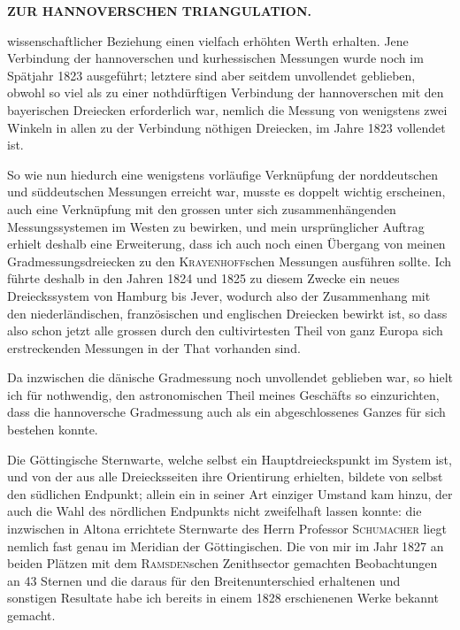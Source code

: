 \noindent\null\hfill{\small\textbf{ZUR HANNOVERSCHEN TRIANGULATION.}}\hfill{}\par\medskip
\noindent wissenschaftlicher Beziehung einen vielfach erhöhten Werth erhalten. Jene
Verbindung der hannoverschen und kurhessischen Messungen wurde noch
im Spätjahr 1823 ausgeführt; letztere sind aber seitdem unvollendet geblieben,
obwohl so viel als zu einer nothdürftigen Verbindung der hannoverschen mit
den bayerischen Dreiecken erforderlich war, nemlich die Messung von wenigstens
zwei Winkeln in allen zu der Verbindung nöthigen Dreiecken, im Jahre
1823 vollendet ist.

\par\noindent\hspace*{\parindent}So wie nun hiedurch eine wenigstens vorläufige Verknüpfung der norddeutschen
und süddeutschen Messungen erreicht war, musste es doppelt wichtig
erscheinen, auch eine Verknüpfung mit den grossen unter sich zusammenhängenden
Messungssystemen im Westen zu bewirken, und mein ursprünglicher
Auftrag erhielt deshalb eine Erweiterung, dass ich auch noch einen Übergang
von meinen Gradmessungsdreiecken zu den \textsc{Krayenhoff}schen Messungen ausführen
sollte. Ich führte deshalb in den Jahren 1824 und 1825 zu diesem
Zwecke ein neues Dreieckssystem von Hamburg bis Jever, wodurch also der
Zusammenhang mit den niederländischen, französischen und englischen Dreiecken
bewirkt ist, so dass also schon jetzt alle grossen durch den cultivirtesten
Theil von ganz Europa sich erstreckenden Messungen in der That vorhanden
sind.

\par\noindent\hspace*{\parindent}Da inzwischen die dänische Gradmessung noch unvollendet geblieben
war, so hielt ich für nothwendig, den astronomischen Theil meines Geschäfts
so einzurichten, dass die hannoversche Gradmessung auch als ein abgeschlossenes
Ganzes für sich bestehen konnte.

\par\noindent\hspace*{\parindent}Die Göttingische Sternwarte, welche selbst ein Hauptdreieckspunkt im
System ist, und von der aus alle Dreiecksseiten ihre Orientirung erhielten,
bildete von selbst den südlichen Endpunkt; allein ein in seiner Art einziger
Umstand kam hinzu, der auch die Wahl des nördlichen Endpunkts nicht
zweifelhaft lassen konnte: die inzwischen in Altona errichtete Sternwarte des
Herrn Professor \textsc{Schumacher} liegt nemlich fast genau im Meridian der Göttingischen.
Die von mir im Jahr 1827 an beiden Plätzen mit dem \textsc{Ramsden}schen
Zenithsector gemachten Beobachtungen an 43 Sternen und die daraus
für den Breitenunterschied erhaltenen und sonstigen Resultate habe ich bereits
in einem 1828 erschienenen Werke bekannt gemacht.

